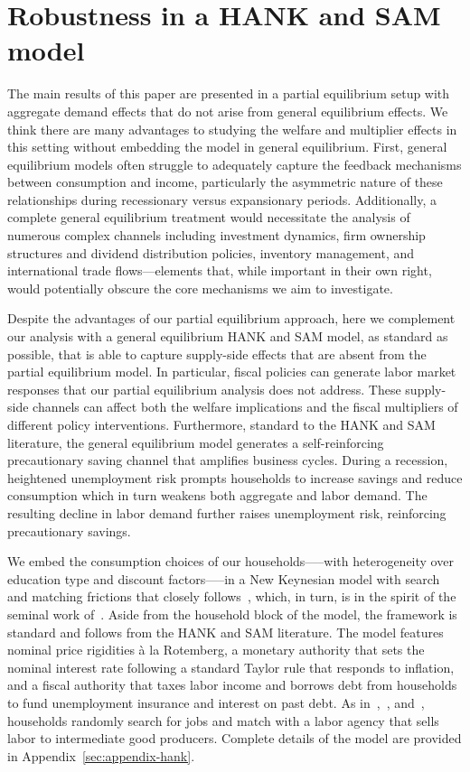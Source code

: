 \documentclass{econsocart}
\begin{document}
\FloatBarrier
\section{Robustness in a HANK and SAM model}
\whenintegrated{\label{sec:hank}} %

The main results of this paper are presented in a partial equilibrium setup with aggregate demand effects that do not arise from general equilibrium effects. We think there are many advantages to studying the welfare and multiplier effects in this setting without embedding the model in general equilibrium.  First, general equilibrium models often struggle to adequately capture the feedback mechanisms between consumption and income, particularly the asymmetric nature of these relationships during recessionary versus expansionary periods. Additionally, a complete general equilibrium treatment would necessitate the analysis of numerous complex channels including investment dynamics, firm ownership structures and dividend distribution policies, inventory management, and international trade flows—elements that, while important in their own right, would potentially obscure the core mechanisms we aim to investigate.

Despite the advantages of our partial equilibrium approach, here we complement our analysis with a general equilibrium HANK and SAM model, as standard as possible, that is able to capture supply-side effects that are absent from the partial equilibrium model. In particular, fiscal policies can generate labor market responses that our partial equilibrium analysis does not address. These supply-side channels can affect both the welfare implications and the fiscal multipliers of different policy interventions. Furthermore, standard to the HANK and SAM literature, the general equilibrium model generates a self-reinforcing precautionary saving channel that amplifies business cycles. During a recession, heightened unemployment risk prompts households to increase savings and reduce consumption which in turn weakens both aggregate and labor demand. The resulting decline in labor demand further raises unemployment risk, reinforcing precautionary savings.

We embed the consumption choices of our households—--with heterogeneity over education type and discount factors—--in a New Keynesian model with search and matching frictions that closely follows~\cite{Du2025}, which, in turn, is in the spirit of the seminal work of~\cite{Ravn2017,Ravn2021}. Aside from the household block of the model, the framework is standard and follows from the HANK and SAM literature. The model features nominal price rigidities \`{a} la Rotemberg, a monetary authority that sets the nominal interest rate following a standard Taylor rule that responds to inflation, and a fiscal authority that taxes labor income and borrows debt from households to fund unemployment insurance and interest on past debt. As in~\cite{Gornemann2021},~\cite{Bardoczy2021}, and~\cite{gravesUnemployment}, households randomly search for jobs and match with a labor agency that sells labor to intermediate good producers. Complete details of the model are provided in Appendix~\ref{sec:appendix-hank}.
\end{document}

